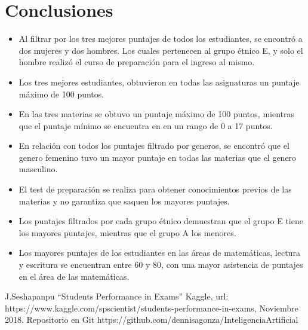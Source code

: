 \documentclass[conference,compsoc,onecolumn]{IEEEtran}
\begin{document}
        \section{Conclusiones}\label{conclusiones}
        \begin{itemize}
        \item Al filtrar por los tres mejores puntajes de todos los estudiantes, se encontró a dos mujeres y dos hombres. Los cuales pertenecen al grupo étnico E, y solo el hombre realizó el curso de preparación para el ingreso al mismo.
        \item Los tres mejores estudiantes, obtuvieron en todas las asignaturas un puntaje máximo de 100 puntos.
        \item En las tres materias se obtuvo un puntaje máximo de 100 puntos, mientras que el puntaje mínimo se encuentra en en un rango de 0 a 17 puntos.
        \item En relación con todos los puntajes filtrado por generos, se encontró que el genero femenino tuvo un mayor puntaje en todas las materias que el genero masculino.
        \item El test de preparación se realiza para obtener conocimientos previos de las materias y no garantiza que saquen los mayores puntajes.
        \item Los puntajes filtrados por cada grupo étnico demuestran que el grupo E tiene los mayores puntajes, mientras que el grupo A los menores.
        \item Los mayores puntajes de los estudiantes en las áreas de matemáticas, lectura y escritura se encuentran entre 60 y 80, con una mayor asistencia de puntajes en el área de las matemáticas.
        \end{itemize} 
        
    \begin{thebibliography}{00}
     J.Seshapanpu ``Students Performance in Exams'' Kaggle, url: https://www.kaggle.com/spscientist/students-performance-in-exams, Noviembre 2018.
     Repositorio en Git https://github.com/dennisagonza/InteligenciaArtificial
    \end{thebibliography}
\end{document}
